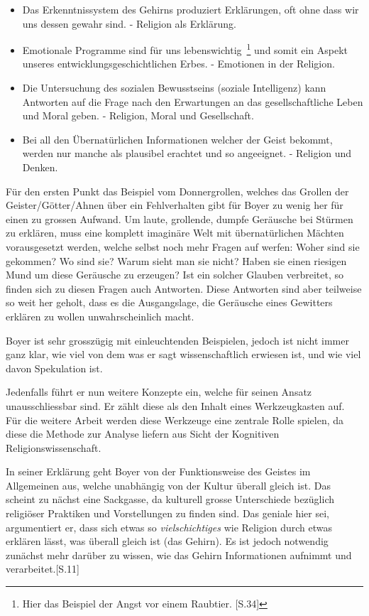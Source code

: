 \begin{itemize}
	\item Das Erkenntnissystem des Gehirns produziert Erklärungen, oft ohne dass wir uns dessen gewahr sind. - Religion als Erklärung.
	\item Emotionale Programme sind für uns lebenswichtig~\footnote{Hier das Beispiel der Angst vor einem Raubtier. [S.34]} und somit ein Aspekt unseres entwicklungsgeschichtlichen Erbes. - Emotionen in der Religion.
	\item Die Untersuchung des sozialen Bewusstseins (soziale Intelligenz) kann Antworten auf die Frage nach den Erwartungen an das gesellschaftliche Leben und Moral geben. - Religion, Moral und Gesellschaft.
	\item Bei all den Übernatürlichen Informationen welcher der Geist bekommt, werden nur manche als plausibel erachtet und so angeeignet. - Religion und Denken.
\end{itemize}

Für den ersten Punkt das Beispiel vom Donnergrollen, welches das Grollen der Geister/Götter/Ahnen über ein Fehlverhalten gibt für Boyer zu wenig her für einen zu grossen Aufwand. Um laute, grollende, dumpfe Geräusche bei Stürmen zu erklären, muss eine komplett imaginäre Welt mit übernatürlichen Mächten vorausgesetzt werden, welche selbst noch mehr Fragen auf werfen: Woher sind sie gekommen? Wo sind sie? Warum sieht man sie nicht? Haben sie einen riesigen Mund um diese Geräusche zu erzeugen? Ist ein solcher Glauben verbreitet, so finden sich zu diesen Fragen auch Antworten. Diese Antworten sind aber teilweise so weit her geholt, dass es die Ausgangslage, die Geräusche eines Gewitters erklären zu wollen unwahrscheinlich macht.

Boyer ist sehr grosszügig mit einleuchtenden Beispielen, jedoch ist nicht immer ganz klar, wie viel von dem was er sagt wissenschaftlich erwiesen ist, und wie viel davon Spekulation ist. 

Jedenfalls führt er nun weitere Konzepte ein, welche für seinen Ansatz unausschliessbar sind. Er zählt diese als den Inhalt eines Werkzeugkasten auf. Für die weitere Arbeit werden diese Werkzeuge eine zentrale Rolle spielen, da diese die Methode zur Analyse liefern aus Sicht der Kognitiven Religionswissenschaft.

In seiner Erklärung geht Boyer von der Funktionsweise des Geistes im Allgemeinen aus, welche unabhängig von der Kultur überall gleich ist. Das scheint zu nächst eine Sackgasse, da kulturell grosse Unterschiede bezüglich religiöser Praktiken und Vorstellungen zu finden sind. Das geniale hier sei, argumentiert er, dass sich etwas so \emph{vielschichtiges} wie Religion durch etwas erklären lässt, was überall gleich ist (das Gehirn). Es ist jedoch notwendig zunächst mehr darüber zu wissen, wie das Gehirn Informationen aufnimmt und verarbeitet.[S.11]

